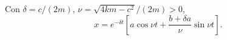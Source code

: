 Con \(\delta=c/(2m)\), \(\nu=\sqrt{4km-c^2}/(2m)>0\),
\[x=e^{-\delta t}\left[a\cos\nu t+\frac{b+\delta a}{\nu}\sin\nu t\right].\]
